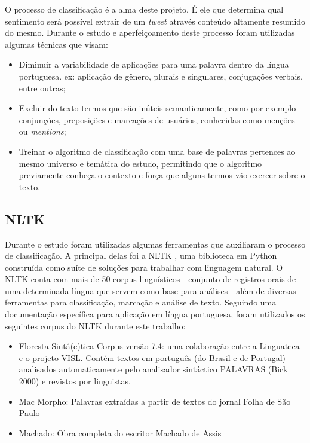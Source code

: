 O processo de classificação é a alma deste projeto. É ele que determina qual sentimento será possível extrair de um \textit{tweet} através conteúdo altamente resumido do mesmo. Durante o estudo e aperfeiçoamento deste processo foram utilizadas algumas técnicas que visam:

\begin{itemize}
	\item Diminuir a variabilidade de aplicações para uma palavra dentro da língua portuguesa. ex: aplicação de gênero, plurais e singulares, conjugações verbais, entre outras;
	\item Excluir do texto termos que são inúteis semanticamente, como por exemplo conjunções, preposições e marcações de usuários, conhecidas como menções ou \textit{mentions};
	\item Treinar o algoritmo de classificação com uma base de palavras pertences ao mesmo universo e temática do estudo, permitindo que o algoritmo previamente conheça o contexto e força que alguns termos vão exercer sobre o texto.
\end{itemize}

\subsection{\ac{NLTK}}
Durante o estudo foram utilizadas algumas ferramentas que auxiliaram o processo de classificação. A principal delas foi a NLTK \cite{nltk_docs}, uma biblioteca em Python construída como suíte de soluções para trabalhar com linguagem natural. O NLTK conta com mais de 50 corpus linguísticos - conjunto de registros orais de uma determinada língua que servem como base para análises - além de diversas ferramentas para classificação, marcação e análise de texto. Seguindo uma documentação específica para aplicação em língua portuguesa\cite{nltk_portuguese}, foram utilizados os seguintes corpus do NLTK durante este trabalho:

\begin{itemize}
	\item Floresta Sintá(c)tica Corpus versão 7.4: uma colaboração entre a Linguateca\cite{linguateca} e o projeto VISL\cite{visl}. Contém textos em português (do Brasil e de Portugal) analisados automaticamente pelo analisador sintáctico PALAVRAS (Bick 2000) e revistos por linguistas.
	\item Mac Morpho: Palavras extraídas a partir de textos do jornal Folha de São Paulo 
	\item Machado: Obra completa do escritor Machado de Assis
\end{itemize}


